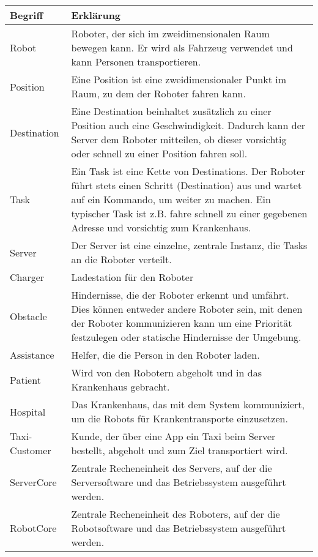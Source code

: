 	\begin{tabularx}{\textwidth}{|l|X|}
		\hline
		\textbf{Begriff} & \textbf{Erklärung}\\ \hline
		Robot & Roboter, der sich im zweidimensionalen Raum bewegen kann. Er wird als Fahrzeug verwendet und kann Personen transportieren.\\ \hline
		Position & Eine Position ist eine zweidimensionaler Punkt im Raum, zu dem der Roboter fahren kann.\\ \hline
		Destination & Eine Destination beinhaltet zusätzlich zu einer Position auch eine Geschwindigkeit. Dadurch kann der Server dem Roboter mitteilen, ob dieser vorsichtig oder schnell zu einer Position fahren soll. \\ \hline
		Task & Ein Task ist eine Kette von Destinations. Der Roboter führt stets einen Schritt (Destination) aus und wartet auf ein Kommando, um weiter zu machen. Ein typischer Task ist z.B. fahre schnell zu einer gegebenen Adresse und vorsichtig zum Krankenhaus.\\ \hline
		Server & Der Server ist eine einzelne, zentrale Instanz, die Tasks an die Roboter verteilt.\\ \hline
		Charger & Ladestation für den Roboter\\ \hline
		Obstacle & Hindernisse, die der Roboter erkennt und umfährt. Dies können
		entweder andere Roboter sein, mit denen der Roboter kommunizieren kann
		um eine Priorität festzulegen oder statische Hindernisse der
		Umgebung.\\ \hline
		Assistance & Helfer, die die Person in den Roboter laden.\\ \hline
		Patient & Wird von den Robotern abgeholt und in das Krankenhaus gebracht.\\ \hline
		Hospital & Das Krankenhaus, das mit dem System kommuniziert, um die Robots für Krankentransporte einzusetzen. \\ \hline
		Taxi-Customer & Kunde, der über eine App ein Taxi beim Server bestellt, abgeholt und zum Ziel transportiert wird.\\ \hline
		ServerCore & Zentrale Recheneinheit des Servers, auf der die Serversoftware und das Betriebssystem ausgeführt werden.\\ \hline
		RobotCore & Zentrale Recheneinheit des Roboters, auf der die Robotsoftware und das Betriebssystem ausgeführt werden.\\ \hline
	\end{tabularx}

